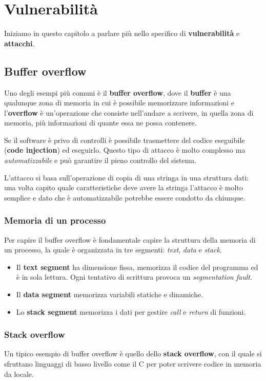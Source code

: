 \chapter{Vulnerabilità}
Iniziamo in questo capitolo a parlare più nello specifico di \textbf{vulnerabilità} e \textbf{attacchi}.

\section{Buffer overflow}
Uno degli esempi più comuni è il \textbf{buffer overflow}, dove il \textbf{buffer} è una qualunque zona di memoria
in cui è possibile memorizzare informazioni e l'\textbf{overflow} è un'operazione che consiste nell'andare a scrivere,
in quella zona di memoria, più informazioni di quante essa ne possa contenere.

Se il software è privo di controlli è possibile trasmettere del codice eseguibile (\textbf{code injection}) ed
eseguirlo. Questo tipo di attacco è molto complesso ma \emph{automatizzabile} e può garantire il pieno controllo del
sistema.

L'attacco si basa sull'operazione di copia di una stringa in una struttura dati: una volta capito quale caratteristiche
deve avere la stringa l'attacco è molto semplice e dato che è automatizzabile potrebbe essere condotto da chiunque.

\subsection{Memoria di un processo}
Per capire il buffer overflow è fondamentale capire la struttura della memoria di un processo, la quale è organizzata
in tre segmenti: \emph{text}, \emph{data} e \emph{stack}.
\begin{itemize}
	\item Il \textbf{text segment} ha dimensione fissa, memorizza il codice del programma ed è in sola lettura. Ogni
	      tentativo di scrittura provoca un \emph{segmentation fault}.
	\item Il \textbf{data segment} memorizza variabili statiche e dinamiche.
	\item Lo \textbf{stack segment} memorizza i dati per gestire \emph{call} e \emph{return} di funzioni.
\end{itemize}

\subsection{Stack overflow}
Un tipico esempio di buffer overflow è quello dello \textbf{stack overflow}, con il quale si sfruttano linguaggi di
basso livello come il C per poter scrivere codice in memoria da locale.

